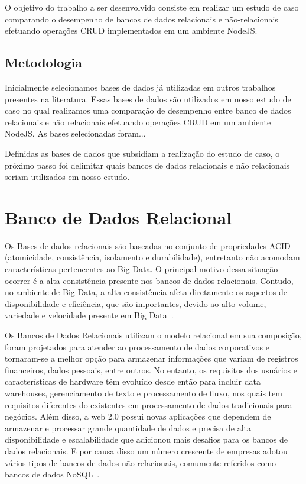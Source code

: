 \documentclass[a4paper,12pt,onecolumn,titlepage]{article}
\begin{document}
O objetivo do trabalho a ser desenvolvido consiste em realizar um estudo de caso comparando o desempenho de bancos de dados relacionais e não-relacionais efetuando operações CRUD implementados em um ambiente NodeJS.

\subsection{Metodologia}
\label{subsec:metodologia}

Inicialmente selecionamos bases de dados já utilizadas em outros trabalhos presentes na literatura. Essas bases de dados são utilizados em nosso estudo de caso no qual realizamos uma comparação de desempenho entre banco de dados relacionais e não relacionais efetuando operações CRUD em um ambiente NodeJS. As bases selecionadas foram...

Definidas as bases de dados que subsidiam a realização do estudo de caso, o próximo passo foi delimitar quais bancos de dados relacionais e não relacionais seriam utilizados em nosso estudo.


\section{Banco de Dados Relacional}
\label{sec:relacional}

Os Bases de dados relacionais são baseadas no conjunto de propriedades ACID (atomicidade, consistência, isolamento e durabilidade), entretanto não acomodam características pertencentes ao Big Data. O principal motivo dessa situação ocorrer é a alta consistência presente nos bancos de dados relacionais. Contudo, no ambiente de Big Data, a alta consistência afeta diretamente os aspectos de disponibilidade e  eficiência, que são importantes, devido ao alto volume, variedade e velocidade presente em Big Data~\citep{aparicio:2016}.

Os Bancos de Dados Relacionais utilizam o modelo relacional em sua composição, foram projetados para atender ao processamento de dados corporativos e tornaram-se a melhor opção para armazenar informações que variam de registros financeiros, dados pessoais, entre outros. No entanto, os requisitos dos usuários e características de hardware têm evoluído desde então para incluir data warehouses, gerenciamento de texto e processamento de fluxo, nos quais tem requisitos diferentes do existentes em processamento de dados tradicionais para negócios. Além disso, a web 2.0 possui novas aplicações que dependem de armazenar e processar grande quantidade de dados e precisa de alta disponibilidade e escalabilidade que adicionou mais desafios para os bancos de dados relacionais. E por causa disso um número crescente de empresas adotou vários tipos de bancos de dados não relacionais, comumente referidos como bancos de dados NoSQL~\citep{mohamed:2014}.
\end{document}
